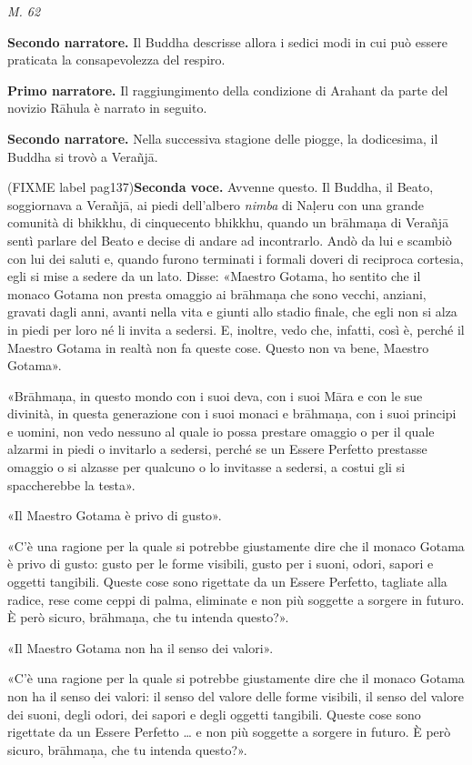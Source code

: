 \emph{M. 62}


\textbf{Secondo narratore.} Il Buddha descrisse allora i sedici modi in cui può
essere praticata la consapevolezza del respiro.


\textbf{Primo narratore.} Il raggiungimento della condizione di Arahant da parte
del novizio Rāhula è narrato in seguito.


\textbf{Secondo narratore.} Nella successiva stagione delle piogge, la
dodicesima, il Buddha si trovò a Verañjā.


(FIXME label pag137)\textbf{Seconda voce.} Avvenne questo. Il Buddha, il Beato, soggiornava a
Verañjā, ai piedi dell’albero \emph{nimba} di Naḷeru con una grande comunità
di bhikkhu, di cinquecento bhikkhu, quando un brāhmaṇa di Verañjā sentì
parlare del Beato e decise di andare ad incontrarlo. Andò da lui e
scambiò con lui dei saluti e, quando furono terminati i formali doveri
di reciproca cortesia, egli si mise a sedere da un lato. Disse: «Maestro
Gotama, ho sentito che il monaco Gotama non presta omaggio ai brāhmaṇa
che sono vecchi, anziani, gravati dagli anni, avanti nella vita e giunti
allo stadio finale, che egli non si alza in piedi per loro né li invita
a sedersi. E, inoltre, vedo che, infatti, così è, perché il Maestro
Gotama in realtà non fa queste cose. Questo non va bene, Maestro
Gotama».


«Brāhmaṇa, in questo mondo con i suoi deva, con i suoi Māra e con le sue
divinità, in questa generazione con i suoi monaci e brāhmaṇa, con i suoi
principi e uomini, non vedo nessuno al quale io possa prestare omaggio o
per il quale alzarmi in piedi o invitarlo a sedersi, perché se un Essere
Perfetto prestasse omaggio o si alzasse per qualcuno o lo invitasse a
sedersi, a costui gli si spaccherebbe la testa».


«Il Maestro Gotama è privo di gusto».


«C’è una ragione per la quale si potrebbe giustamente dire che il monaco
Gotama è privo di gusto: gusto per le forme visibili, gusto per i suoni,
odori, sapori e oggetti tangibili. Queste cose sono rigettate da un
Essere Perfetto, tagliate alla radice, rese come ceppi di palma,
eliminate e non più soggette a sorgere in futuro. È però sicuro,
brāhmaṇa, che tu intenda questo?».


«Il Maestro Gotama non ha il senso dei valori».


«C’è una ragione per la quale si potrebbe giustamente dire che il monaco
Gotama non ha il senso dei valori: il senso del valore delle forme
visibili, il senso del valore dei suoni, degli odori, dei sapori e degli
oggetti tangibili. Queste cose sono rigettate da un Essere Perfetto … e
non più soggette a sorgere in futuro. È però sicuro, brāhmaṇa, che tu
intenda questo?».


